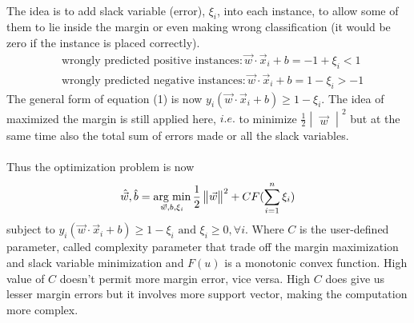 \documentclass{article}
\begin{document}
\paragraph{}
The idea is to add slack variable (error), $\xi_i$, into each instance, to allow some of them to lie inside the margin or even making wrong classification (it would be zero if the instance is placed correctly).
\begin{align*}
    &\text{wrongly predicted positive instances}: \Vec{w} \cdot \Vec{x}_{i} + b = -1 + \xi_i < 1 \\
    &\text{wrongly predicted negative instances}: \Vec{w} \cdot \Vec{x}_{i} + b = 1 - \xi_i > -1
\end{align*}
The general form of equation (1) is now $y_i(\Vec{w}\cdot\Vec{x}_i+b) \geq 1 - \xi_i$. The idea of maximized the margin is still applied here, $i.e.$ to minimize $\frac{1}{2}\begin{vmatrix} \Vec{w} \end{vmatrix}^2$ but at the same time also the total sum of errors made or all the slack variables. 

\paragraph{}
Thus the optimization problem is now
\begin{equation}
    \hat{\Vec{w}}, \hat{b} = \operatorname*{arg \hspace{1mm} min}_{\Vec{w}, b, \xi_i} \frac{1}{2} \begin{Vmatrix}
    \Vec{w} \end{Vmatrix}^2 + C F(\displaystyle\sum_{i=1}^{n} \xi_i)
\end{equation}
subject to $y_i(\Vec{w} \cdot \Vec{x}_i + b) \geq 1-\xi_i \text{ and } \xi_i \geq 0, \forall i$. Where $C$ is the user-defined parameter, called complexity parameter that trade off the margin maximization and slack variable minimization and $F(u)$ is a monotonic convex function. High value of $C$ doesn't permit more margin error, vice versa. High $C$ does give us lesser margin errors but it involves more support vector, making the computation more complex. 
\end{document}
